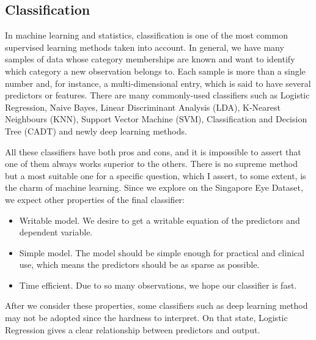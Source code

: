 \documentclass[]{article}
\begin{document}
\subsection{Classification}
In machine learning and statistics, classification is one of the most common supervised learning methods taken into account. In general, we have many samples of data whose category memberships are known and want to identify which category a new observation belongs to. Each sample is more than a single number and, for instance, a multi-dimensional entry, which is said to have several predictors or features. There are many commonly-used classifiers such as Logistic Regression\cite{harrell2001ordinal}, Naive Bayes\cite{ng2002discriminative}, Linear Discriminant
Analysis (LDA)\cite{mika1999fisher}, K-Nearest Neighbours (KNN)\cite{peterson2009k}, Support Vector Machine (SVM)\cite{hearst1998support}, Classification and Decision Tree (CADT)\cite{safavian1991survey} and newly deep learning methods\cite{fogel1990evolving}.

All these classifiers have both pros and cons, and it is impossible to assert that one of them always works superior to the others. There is no supreme method but a most suitable one for a specific question, which I assert, to some extent, is the charm of machine learning. Since we explore on the Singapore Eye Dataset, we expect other properties of the final classifier:
\begin{itemize}
	\item Writable model. We desire to get a writable equation of the predictors and dependent variable.
	\item Simple model. The model should be simple enough for practical and clinical use, which means the predictors should be as sparse as possible.
	\item Time efficient. Due to so many observations, we hope our classifier is fast.
\end{itemize}
After we consider these properties, some classifiers such as deep learning method may not be adopted since the hardness to interpret. On that state, Logistic Regression gives a clear relationship between predictors and output. 
\end{document}
